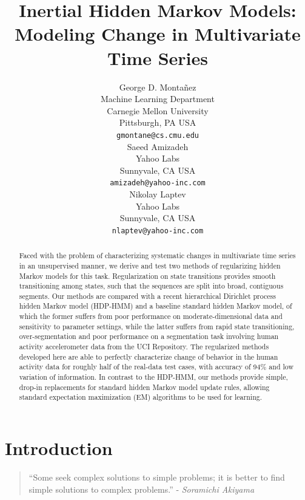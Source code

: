 \documentclass[letterpaper]{article}
\title{Inertial Hidden Markov Models: Modeling Change in Multivariate Time Series}
\author{George D. Monta\~nez \\
Machine Learning Department\\
Carnegie Mellon University\\
Pittsburgh, PA USA\\
\texttt{gmontane@cs.cmu.edu} \\
\And
Saeed Amizadeh\\
Yahoo Labs\\
Sunnyvale, CA USA\\
\texttt{amizadeh@yahoo-inc.com}\\
\And
Nikolay Laptev\\
Yahoo Labs\\
Sunnyvale, CA USA\\
\texttt{nlaptev@yahoo-inc.com}}
\newenvironment{dedication}
        {\vspace{0.0ex}\begin{quotation}\begin{center}\begin{em}}
        {\par\end{em}\end{center}\end{quotation}}
\begin{document}
\maketitle

\begin{abstract}
    Faced with the problem of characterizing systematic changes in multivariate
    time series in an unsupervised manner, we derive and test two methods of regularizing hidden
    Markov models for this task. Regularization on state transitions provides
    smooth transitioning among states, such that the sequences are split into
    broad, contiguous segments. Our methods are compared with a recent
    hierarchical Dirichlet process hidden Markov model (HDP-HMM) and a baseline
    standard hidden Markov model, of which the former suffers from poor
    performance on moderate-dimensional data and sensitivity to parameter
    settings, while the latter suffers from rapid state transitioning,
    over-segmentation and poor performance on a segmentation task involving
    human activity accelerometer data from the UCI Repository.
    The regularized methods developed here are able to perfectly characterize
    change of behavior in the human activity data for roughly half of the real-data
    test cases, with accuracy of 94\% and low variation of information. In contrast to the
    HDP-HMM, our methods provide simple, drop-in replacements for standard
    hidden Markov model update rules, allowing standard expectation maximization
    (EM) algorithms to be used for learning. 
\end{abstract}

\section{Introduction}

\begin{dedication} ``Some seek complex solutions to simple problems; it is better to find simple solutions to complex problems.'' - \emph{Soramichi Akiyama}
\end{dedication}
\end{document}
